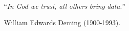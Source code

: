 \documentclass[
11pt, %
english, %
singlespacing, %
headsepline, %
]{mediaproject} %
\begin{document}
\cleardoublepage


\vspace*{0.2\textheight}

\begin{center}
\noindent\enquote{\itshape In God we trust, all others bring data.}\bigbreak  
\end{center}
\hfill William Edwards Deming (1900-1993).

\end{document}
